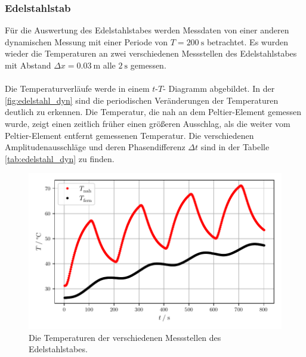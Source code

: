 \subsubsection{Edelstahlstab}
Für die Auswertung des Edelstahlstabes werden Messdaten von einer anderen dynamischen Messung mit einer Periode von $T = \SI{200}{\second}$ betrachtet.
Es wurden wieder die Temperaturen an zwei verschiedenen Messstellen des Edelstahlstabes mit Abstand $\Delta x = \SI{0.03}{\metre}$ alle $ \SI{2}{\second}$ gemessen.\\
\\
Die Temperaturverläufe werde in einem $t$-$T$- Diagramm abgebildet. 
In der \autoref{fig:edelstahl_dyn} sind die periodischen Veränderungen der Temperaturen deutlich zu erkennen.
Die Temperatur, die nah an dem Peltier-Element gemessen wurde, zeigt einen zeitlich früher einen größeren Ausschlag, als die weiter vom Peltier-Element entfernt gemessenen Temperatur.
Die verschiedenen Amplitudenausschläge und deren Phasendifferenz $\Delta t$ sind in der Tabelle \ref{tab:edelstahl_dyn} zu finden. 
\begin{figure}
  \centering
  \includegraphics{build/plot_edelstahl.pdf}
  \caption{Die Temperaturen der verschiedenen Messstellen des Edelstahlstabes.}
  \label{fig:edelstahl_dyn}
\end{figure}

